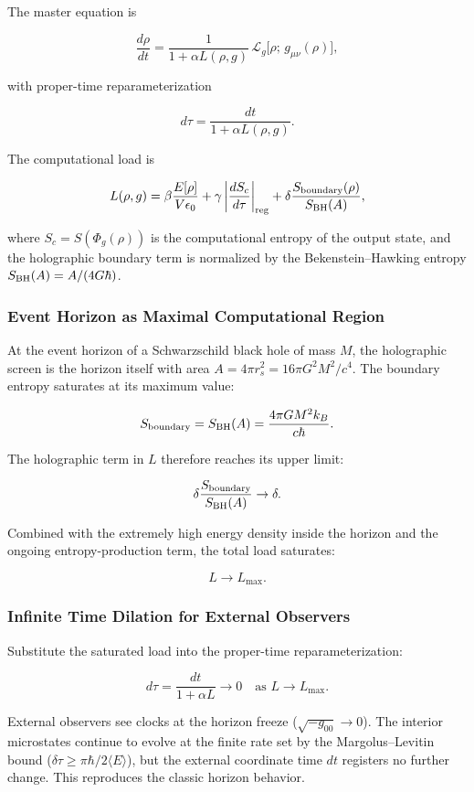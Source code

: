 \documentclass[reprint,amsmath,amssymb,aps,prd,preprintnumbers,superscriptaddress,longbibliography,10pt]{revtex4-2}
\begin{document}
The master equation is

\[
\frac{d\rho}{dt} = \frac{1}{1 + \alpha L(\rho,g)} \,\mathcal{L}_g\bigl[\rho;\, g_{\mu\nu}(\rho)\bigr],
\]

with proper-time reparameterization

\[
d\tau = \frac{dt}{1 + \alpha L(\rho,g)}.
\]

The computational load is

\[
L(\rho,g) = \beta \frac{E[\rho]}{V \epsilon_0} + \gamma \left| \frac{d S_c}{d\tau} \right|_{\rm reg} + \delta \frac{S_{\rm boundary}(\rho)}{S_{\rm BH}(A)},
\]

where \(S_c = S(\Phi_g(\rho))\) is the computational entropy of the output state, and the holographic boundary term is normalized by the Bekenstein–Hawking entropy \(S_{\rm BH}(A) = A / (4G\hbar)\).

\subsubsection{Event Horizon as Maximal Computational Region}

At the event horizon of a Schwarzschild black hole of mass \(M\), the holographic screen is the horizon itself with area \(A = 4\pi r_s^2 = 16\pi G^2 M^2 / c^4\). The boundary entropy saturates at its maximum value:

\[
S_{\rm boundary} = S_{\rm BH}(A) = \frac{4\pi G M^2 k_B}{c \hbar}.
\]

The holographic term in \(L\) therefore reaches its upper limit:

\[
\delta \frac{S_{\rm boundary}}{S_{\rm BH}(A)} \to \delta.
\]

Combined with the extremely high energy density inside the horizon and the ongoing entropy-production term, the total load saturates:

\[
L \to L_{\max}.
\]

\subsubsection{Infinite Time Dilation for External Observers}

Substitute the saturated load into the proper-time reparameterization:

\[
d\tau = \frac{dt}{1 + \alpha L} \to 0 \quad \text{as } L \to L_{\max}.
\]

External observers see clocks at the horizon freeze (\(\sqrt{-g_{00}} \to 0\)). The interior microstates continue to evolve at the finite rate set by the Margolus–Levitin bound (\(\delta\tau \geq \pi\hbar / 2\langle E \rangle\)), but the external coordinate time \(dt\) registers no further change. This reproduces the classic horizon behavior.
\end{document}
